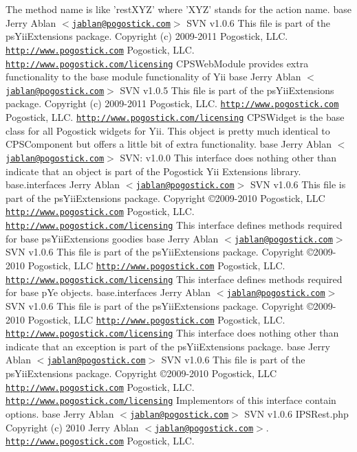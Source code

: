 The method name is like 'restXYZ' where 'XYZ' stands for the action name.   base   Jerry Ablan $<$\href{mailto:jablan@pogostick.com}{\tt jablan@pogostick.com}$>$  SVN   v1.0.6    This file is part of the psYiiExtensions package.   Copyright (c) 2009-\/2011 Pogostick, LLC.  \href{http://www.pogostick.com}{\tt http://www.pogostick.com} Pogostick, LLC.  \href{http://www.pogostick.com/licensing}{\tt http://www.pogostick.com/licensing} CPSWebModule provides extra functionality to the base module functionality of Yii   base   Jerry Ablan $<$\href{mailto:jablan@pogostick.com}{\tt jablan@pogostick.com}$>$  SVN   v1.0.5    This file is part of the psYiiExtensions package.   Copyright (c) 2009-\/2011 Pogostick, LLC.  \href{http://www.pogostick.com}{\tt http://www.pogostick.com} Pogostick, LLC.  \href{http://www.pogostick.com/licensing}{\tt http://www.pogostick.com/licensing} CPSWidget is the base class for all Pogostick widgets for Yii. This object is pretty much identical to CPSComponent but offers a little bit of extra functionality.   base   Jerry Ablan $<$\href{mailto:jablan@pogostick.com}{\tt jablan@pogostick.com}$>$  SVN:   v1.0.0    This interface does nothing other than indicate that an object is part of the Pogostick Yii Extensions library.   base.interfaces   Jerry Ablan $<$\href{mailto:jablan@pogostick.com}{\tt jablan@pogostick.com}$>$  SVN   v1.0.6  This file is part of the psYiiExtensions package.   Copyright \copyright 2009-\/2010 Pogostick, LLC  \href{http://www.pogostick.com}{\tt http://www.pogostick.com} Pogostick, LLC.  \href{http://www.pogostick.com/licensing}{\tt http://www.pogostick.com/licensing} This interface defines methods required for base psYiiExtensions goodies   base   Jerry Ablan $<$\href{mailto:jablan@pogostick.com}{\tt jablan@pogostick.com}$>$  SVN   v1.0.6    This file is part of the psYiiExtensions package.   Copyright \copyright 2009-\/2010 Pogostick, LLC  \href{http://www.pogostick.com}{\tt http://www.pogostick.com} Pogostick, LLC.  \href{http://www.pogostick.com/licensing}{\tt http://www.pogostick.com/licensing}  This interface defines methods required for base pYe objects.   base.interfaces   Jerry Ablan $<$\href{mailto:jablan@pogostick.com}{\tt jablan@pogostick.com}$>$  SVN   v1.0.6  This file is part of the psYiiExtensions package.   Copyright \copyright 2009-\/2010 Pogostick, LLC  \href{http://www.pogostick.com}{\tt http://www.pogostick.com} Pogostick, LLC.  \href{http://www.pogostick.com/licensing}{\tt http://www.pogostick.com/licensing} This interface does nothing other than indicate that an exception is part of the psYiiExtensions package.   base   Jerry Ablan $<$\href{mailto:jablan@pogostick.com}{\tt jablan@pogostick.com}$>$  SVN   v1.0.6    This file is part of the psYiiExtensions package.   Copyright \copyright 2009-\/2010 Pogostick, LLC  \href{http://www.pogostick.com}{\tt http://www.pogostick.com} Pogostick, LLC.  \href{http://www.pogostick.com/licensing}{\tt http://www.pogostick.com/licensing} Implementors of this interface contain options.   base   Jerry Ablan $<$\href{mailto:jablan@pogostick.com}{\tt jablan@pogostick.com}$>$  SVN   v1.0.6    IPSRest.php  Copyright (c) 2010 Jerry Ablan $<$\href{mailto:jablan@pogostick.com}{\tt jablan@pogostick.com}$>$.  \href{http://www.pogostick.com}{\tt http://www.pogostick.com} Pogostick, LLC.  